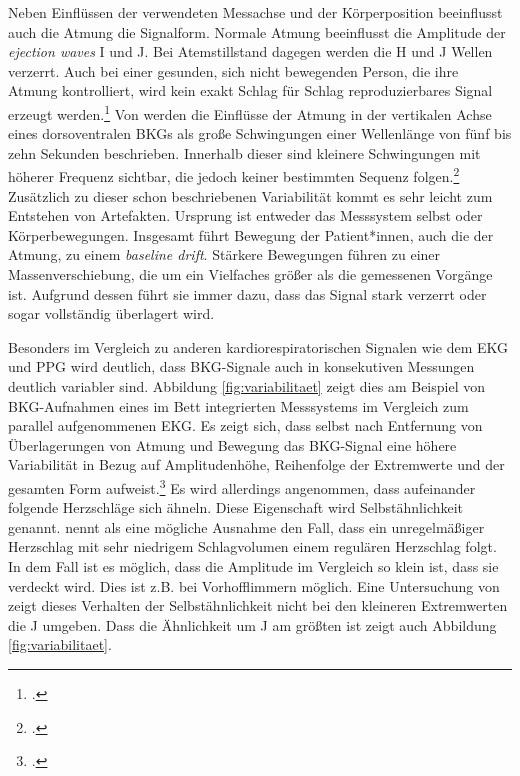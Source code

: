 	Neben Einflüssen der verwendeten Messachse und der Körperposition beeinflusst auch die Atmung die Signalform. Normale Atmung beeinflusst die Amplitude der \textit{ejection waves} I und J. Bei Atemstillstand dagegen werden die H und J Wellen verzerrt. Auch bei einer gesunden, sich nicht bewegenden Person, die ihre Atmung kontrolliert, wird kein exakt Schlag für Schlag reproduzierbares Signal erzeugt werden.\footcite[Vgl.][]{Pinheiro2010} Von \citeauthor{Zink2017} werden die Einflüsse der Atmung in der vertikalen Achse eines dorsoventralen \ac{BKG}s als große Schwingungen einer Wellenlänge von fünf bis zehn Sekunden beschrieben. Innerhalb dieser sind kleinere Schwingungen mit höherer Frequenz sichtbar, die jedoch keiner bestimmten Sequenz folgen.\footcite[Vgl.][]{Zink2017} Zusätzlich zu dieser schon beschriebenen Variabilität kommt es sehr leicht zum Entstehen von Artefakten. Ursprung ist entweder das Messsystem selbst oder Körperbewegungen. Insgesamt führt Bewegung der Patient*innen, auch die der Atmung, zu einem \textit{baseline drift}. Stärkere Bewegungen führen zu einer Massenverschiebung, die um ein Vielfaches größer als die gemessenen Vorgänge ist. Aufgrund dessen führt sie immer dazu, dass das Signal stark verzerrt oder sogar vollständig überlagert wird.

	
	Besonders im Vergleich zu anderen kardiorespiratorischen Signalen wie dem \ac{EKG} und \ac{PPG} wird deutlich, dass \ac{BKG}-Signale auch in konsekutiven Messungen deutlich variabler sind. Abbildung \ref{fig:variabilitaet} zeigt dies am Beispiel von \ac{BKG}-Aufnahmen eines im Bett integrierten Messsystems im Vergleich zum parallel aufgenommenen \ac{EKG}. Es zeigt sich, dass selbst nach Entfernung von Überlagerungen von Atmung  und Bewegung das \ac{BKG}-Signal eine höhere Variabilität in Bezug auf Amplitudenhöhe, Reihenfolge der Extremwerte und der gesamten Form aufweist.\footcite[Vgl.][]{Zink2017} Es wird allerdings angenommen, dass aufeinander folgende Herzschläge sich ähneln. Diese Eigenschaft wird Selbstähnlichkeit genannt. \citeauthor{Bruser2013} nennt als eine mögliche Ausnahme den Fall, dass ein unregelmäßiger Herzschlag mit sehr niedrigem Schlagvolumen einem regulären Herzschlag folgt. In dem Fall ist es möglich, dass die Amplitude im Vergleich so klein ist, dass sie verdeckt wird. Dies ist z.B. bei Vorhofflimmern möglich. Eine Untersuchung von \citeauthor{Rosales2012} zeigt dieses Verhalten der Selbstähnlichkeit nicht bei den kleineren Extremwerten die J umgeben. Dass die Ähnlichkeit um J am größten ist zeigt auch Abbildung \ref{fig:variabilitaet}.
	

